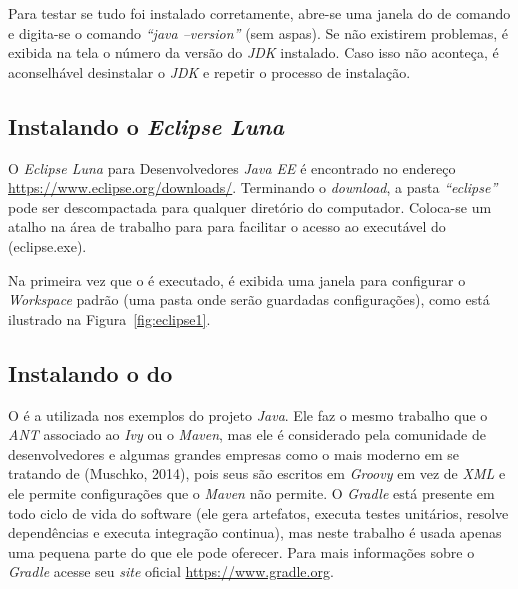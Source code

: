 
Para testar se tudo foi instalado corretamente, abre-se uma janela do  de comando e digita-se o comando \textit{“java –version”} (sem aspas). Se não existirem problemas, é exibida na tela o número da versão do \textit{JDK} instalado. Caso isso não aconteça, é aconselhável desinstalar o \textit{JDK} e repetir o processo de instalação. 

\subsection{Instalando o \textit{Eclipse Luna}} 

O \textit{Eclipse Luna} para Desenvolvedores \textit{Java EE} é encontrado no endereço \url{https://www.eclipse.org/downloads/}. Terminando o \textit{download}, a pasta \textit{“eclipse”} pode ser descompactada para qualquer diretório do computador. Coloca-se um atalho na área de trabalho para  para facilitar o acesso ao executável do  (eclipse.exe).

Na primeira vez que o  é executado, é exibida uma janela para configurar o \textit{Workspace} padrão (uma pasta onde serão guardadas configurações), como está ilustrado na Figura~\ref{fig:eclipse1}.


\subsection{Instalando o  do } 

O  é a  utilizada nos exemplos do projeto \textit{Java}. Ele faz o mesmo trabalho que o \textit{ANT} associado ao \textit{Ivy} ou o \textit{Maven}, mas ele é considerado pela comunidade de desenvolvedores e algumas grandes empresas como o mais moderno em se tratando de  (Muschko, 2014), pois seus  são escritos em \textit{Groovy} em vez de \textit{XML} e ele permite configurações que o \textit{Maven} não permite. O \textit{Gradle} está presente em todo ciclo de vida do software (ele gera artefatos, executa testes unitários, resolve dependências e executa integração continua), mas neste trabalho é usada apenas uma pequena parte do que ele pode oferecer. Para mais informações sobre o \textit{Gradle} acesse seu \textit{site} oficial \url{https://www.gradle.org}. 

